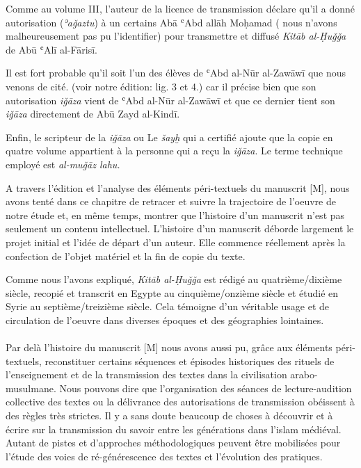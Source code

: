 \documentclass[a4paper,12pt]{report}
\begin{document}
 Comme au volume III, l'auteur de la licence de transmission déclare qu'il a donné autorisation (\textit{ʾaǧaztu}) à un certains Abā ʿAbd allāh Moḥamad ( nous n'avons malheureusement pas pu l'identifier) pour  transmettre et diffusé 
\textit{ Kitāb al-Ḥuǧǧa} de Abū ʿAlī al-Fārisī. 

Il est fort probable qu'il soit l'un des élèves de ʿAbd al-Nūr al-Zawāwī que nous venons de cité. (voir notre édition: lig. 3 et 4.) 
car il  précise bien que son autorisation \textit{iǧāza} vient  de   ʿAbd al-Nūr al-Zawāwī et que ce dernier tient son 
\textit{iǧāza} directement de Ab\=u Zayd al-Kind\=i. 


Enfin, le scripteur de la \textit{iǧāza}  ou  Le\textit{ šayḫ} qui a certifié    ajoute que la copie en quatre volume appartient  à la personne qui a reçu la \textit{iǧāza}. Le terme technique employé est \textit{al-muǧāz lahu.}
 
 
\newpage
A travers l'édition et l'analyse des éléments péri-textuels du manuscrit [M],  nous avons tenté dans ce chapitre de retracer et suivre la  trajectoire de l'oeuvre de notre étude et, en même temps,  montrer  que l'histoire d'un manuscrit n'est pas seulement un contenu intellectuel. L'histoire  d'un manuscrit déborde largement le projet initial et l'idée de départ d'un auteur. Elle commence réellement après la confection de l'objet matériel et la fin de  copie du texte.

Comme nous l'avons expliqué, \textit{Kitāb al-Ḥuǧǧa} est rédigé   au quatrième/dixième siècle, recopié et transcrit en Egypte au cinquième/onzième siècle et étudié  en Syrie au septième/treizième siècle. Cela témoigne d'un véritable usage  et de  circulation de l'oeuvre dans diverses époques et des géographies lointaines. 
\paragraph{}
Par delà l'histoire du manuscrit [M] nous avons aussi pu, grâce aux éléments péri-textuels, reconstituer certains séquences  et épisodes historiques des rituels  de l'enseignement et de la transmission des  textes dans la civilisation arabo-musulmane. Nous pouvons dire que   l'organisation des séances de lecture-audition collective des textes ou la délivrance des  autorisations de transmission  obéissent à des  règles très strictes. Il y a sans doute beaucoup de choses à  découvrir et à écrire sur la transmission du savoir entre les générations dans l'islam médiéval. Autant de pistes et d'approches méthodologiques peuvent être mobilisées pour l'étude des  voies de ré-générescence des textes et l'évolution des pratiques.       
\end{document}
